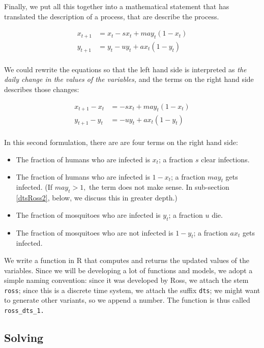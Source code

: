 \documentclass[
]{book}
\begin{document}
Finally, we put all this together into a mathematical statement that has translated the description of a process, that are describe the process.

\[\begin{array}{rl}
x_{t+1} &=  x_t - s x_t + m a y_t (1-x_t)  \\ 
y_{t+1} &=  y_t - u y_t + a x_t (1 - y_t) \\ 
\end{array}\]

We could rewrite the equations so that the left hand side is interpreted as \emph{the daily change in the values of the variables,} and the terms on the right hand side describes those changes:

\[
\begin{array}{rl}
x_{t+1} - x_t &=  - s x_t + m a y_t (1-x_t)  \\ 
y_{t+1} - y_t &=  - u y_t + a x_t (1 - y_t) \\ 
\end{array}
\]

In this second formulation, there are are four terms on the right hand side:

\begin{itemize}
\item
  The fraction of humans who are infected is \(x_t\); a fraction \(s\) clear infections.
\item
  The fraction of humans who are infected is \(1-x_t\); a fraction \(m a y_t\) gets infected. (If \(may_t >1,\) the term does not make sense. In sub-section \ref{dtsRoss2}, below, we discuss this in greater depth.)
\item
  The fraction of mosquitoes who are infected is \(y_t\); a fraction \(u\) die.
\item
  The fraction of mosquitoes who are not infected is \(1-y_t\); a fraction \(a x_t\) gets infected.
\end{itemize}

We write a function in R that computes and returns the updated values of the variables. Since we will be developing a lot of functions and models, we adopt a simple naming convention: since it was developed by Ross, we attach the stem \texttt{ross}; since this is a discrete time system, we attach the suffix \texttt{dts}; we might want to generate other variants, so we append a number. The function is thus called \texttt{ross\_dts\_1.}

\subsection{Solving}\label{solving}
\end{document}
